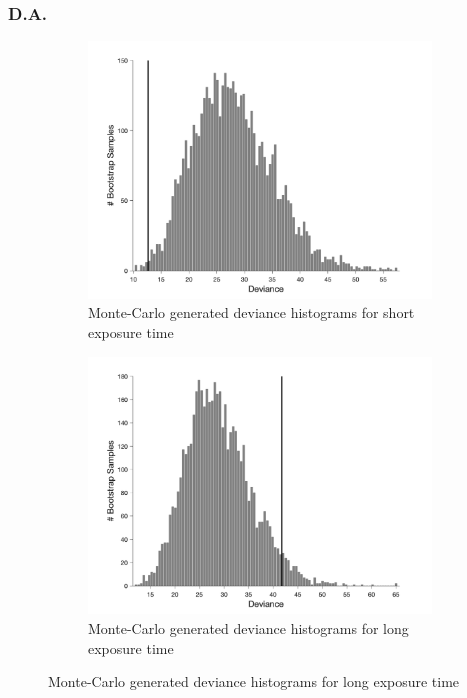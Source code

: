 \documentclass{article}
\begin{document}
\subsubsection*{D.A.}
\begin{figure}[!hb]
    \begin{subfigure}{0.494\textwidth}
        \centering
        \includegraphics[width = \linewidth]{Thesis/plots/gof/segSize/segSize_da_short_bootstrap.png}
        \caption{Monte-Carlo generated deviance histograms for short exposure time}
        \label{fig:da_gof_short_bootstrap}
    \end{subfigure}
    \hspace{0.01\textwidth}
    \begin{subfigure}{0.494\textwidth}
        \centering
        \includegraphics[width = \linewidth]{Thesis/plots/gof/segSize/segSize_da_long_bootstrap.png}
        \caption{Monte-Carlo generated deviance histograms for long exposure time}
        \label{fig:da_gof_long_bootstrap}
    \end{subfigure}
    

\end{figure}
\end{document}
